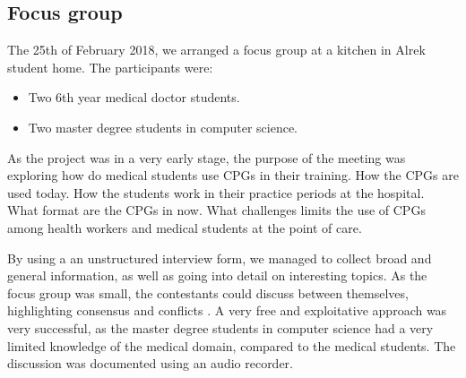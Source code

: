 \subsection{Focus group}
The 25th of February 2018, we arranged a focus group at a kitchen in Alrek student home. The participants were:
\begin{itemize}
	\item Two 6th year medical doctor students.
	\item Two master degree students in computer science.
\end{itemize}

As the project was in a very early stage, the purpose of the meeting was exploring how do medical students use CPGs in their training. How the CPGs are used today. How the students work in their practice periods at the hospital. What format are the CPGs in now. What challenges limits the use of CPGs among health workers and medical students at the point of care.

By using a an unstructured interview form, we managed to collect broad and general information, as well as going into detail on interesting topics. As the focus group was small, the contestants could discuss between themselves, highlighting consensus and conflicts \parencite{Preece2015}. A very free and exploitative approach was very successful, as the master degree students in computer science had a very limited knowledge of the medical domain, compared to the medical students. The discussion was documented using an audio recorder.


